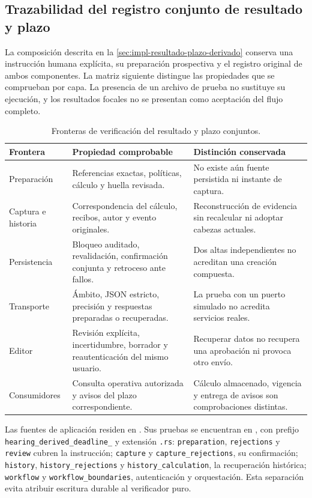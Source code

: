 \subsection{Trazabilidad del registro conjunto de resultado y plazo}\label{sec:matriz-resultado-plazo-derivado}

La composición descrita en la \cref{sec:impl-resultado-plazo-derivado} conserva una instrucción humana explícita, su preparación prospectiva y el registro original de ambos componentes. La matriz siguiente distingue las propiedades que se comprueban por capa. La presencia de un archivo de prueba no sustituye su ejecución, y los resultados focales no se presentan como aceptación del flujo completo.

\begin{table}[H]
  \centering
  \caption{Fronteras de verificación del resultado y plazo conjuntos.}
  \label{tab:matriz-resultado-plazo-derivado}
  \begin{tabularx}{\linewidth}{@{}L{2.8cm} X X@{}}
    \toprule
    \textbf{Frontera} & \textbf{Propiedad comprobable} & \textbf{Distinción conservada} \\
    \midrule
    Preparación & Referencias exactas, políticas, cálculo y huella revisada. & No existe aún fuente persistida ni instante de captura. \\
    Captura e historia & Correspondencia del cálculo, recibos, autor y evento originales. & Reconstrucción de evidencia sin recalcular ni adoptar cabezas actuales. \\
    Persistencia & Bloqueo auditado, revalidación, confirmación conjunta y retroceso ante fallos. & Dos altas independientes no acreditan una creación compuesta. \\
    Transporte & Ámbito, JSON estricto, precisión y respuestas preparadas o recuperadas. & La prueba con un puerto simulado no acredita servicios reales. \\
    Editor & Revisión explícita, incertidumbre, borrador y reautenticación del mismo usuario. & Recuperar datos no recupera una aprobación ni provoca otro envío. \\
    Consumidores & Consulta operativa autorizada y avisos del plazo correspondiente. & Cálculo almacenado, vigencia y entrega de avisos son comprobaciones distintas. \\
    \bottomrule
  \end{tabularx}
\end{table}

{\raggedright Las fuentes de aplicación residen en . Sus pruebas se encuentran en , con prefijo \texttt{hearing\_derived\_deadline\_} y extensión \texttt{.rs}: \texttt{preparation}, \texttt{rejections} y \texttt{review} cubren la instrucción; \texttt{capture} y \texttt{capture\_rejections}, su confirmación; \texttt{history}, \texttt{history\_rejections} y \texttt{history\_calculation}, la recuperación histórica; \texttt{workflow} y \texttt{workflow\_boundaries}, autenticación y orquestación. Esta separación evita atribuir escritura durable al verificador puro.\par}

